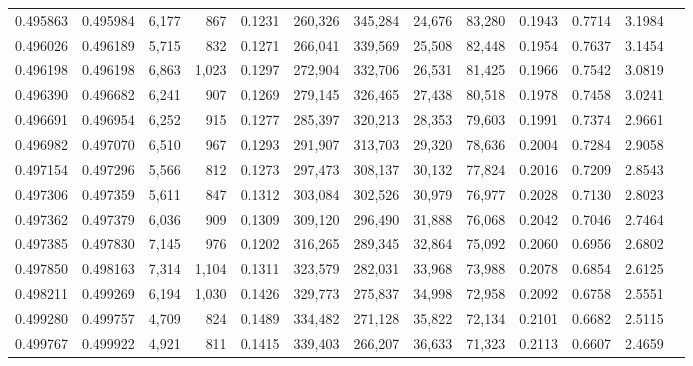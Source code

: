\begin{tabular}{rrrrrrrrrrrrr}
0.495863 & 0.495984 &  6,177 &   867 &                                     0.1231 & 260,326 & 345,284 &  24,676 &  83,280 & 0.1943 & 0.7714 & 3.1984 \\
0.496026 & 0.496189 &  5,715 &   832 &                                     0.1271 & 266,041 & 339,569 &  25,508 &  82,448 & 0.1954 & 0.7637 & 3.1454 \\
0.496198 & 0.496198 &  6,863 & 1,023 &                                     0.1297 & 272,904 & 332,706 &  26,531 &  81,425 & 0.1966 & 0.7542 & 3.0819 \\
0.496390 & 0.496682 &  6,241 &   907 &                                     0.1269 & 279,145 & 326,465 &  27,438 &  80,518 & 0.1978 & 0.7458 & 3.0241 \\
0.496691 & 0.496954 &  6,252 &   915 &                                     0.1277 & 285,397 & 320,213 &  28,353 &  79,603 & 0.1991 & 0.7374 & 2.9661 \\
0.496982 & 0.497070 &  6,510 &   967 &                                     0.1293 & 291,907 & 313,703 &  29,320 &  78,636 & 0.2004 & 0.7284 & 2.9058 \\
0.497154 & 0.497296 &  5,566 &   812 &                                     0.1273 & 297,473 & 308,137 &  30,132 &  77,824 & 0.2016 & 0.7209 & 2.8543 \\
0.497306 & 0.497359 &  5,611 &   847 &                                     0.1312 & 303,084 & 302,526 &  30,979 &  76,977 & 0.2028 & 0.7130 & 2.8023 \\
0.497362 & 0.497379 &  6,036 &   909 &                                     0.1309 & 309,120 & 296,490 &  31,888 &  76,068 & 0.2042 & 0.7046 & 2.7464 \\
0.497385 & 0.497830 &  7,145 &   976 &                                     0.1202 & 316,265 & 289,345 &  32,864 &  75,092 & 0.2060 & 0.6956 & 2.6802 \\
0.497850 & 0.498163 &  7,314 & 1,104 &                                     0.1311 & 323,579 & 282,031 &  33,968 &  73,988 & 0.2078 & 0.6854 & 2.6125 \\
0.498211 & 0.499269 &  6,194 & 1,030 &                                     0.1426 & 329,773 & 275,837 &  34,998 &  72,958 & 0.2092 & 0.6758 & 2.5551 \\
0.499280 & 0.499757 &  4,709 &   824 &                                     0.1489 & 334,482 & 271,128 &  35,822 &  72,134 & 0.2101 & 0.6682 & 2.5115 \\
0.499767 & 0.499922 &  4,921 &   811 &                                     0.1415 & 339,403 & 266,207 &  36,633 &  71,323 & 0.2113 & 0.6607 & 2.4659 \\

\end{tabular}
